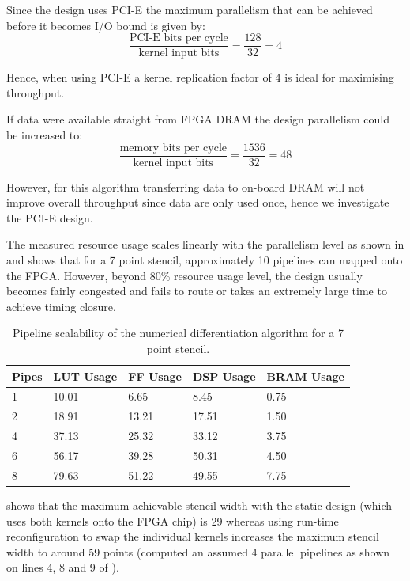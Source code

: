 Since the design uses PCI-E the maximum parallelism that can be
achieved before it becomes I/O bound is given by:
$$\frac{\text{PCI-E bits per cycle}}{\text{kernel input bits}} = \frac{128}{32} = 4$$

Hence, when using PCI-E a kernel replication factor of 4 is ideal for
maximising throughput.

If data were available straight from FPGA DRAM the design parallelism
could be increased to:
$$\frac{\text{memory bits per cycle}}{\text{kernel input bits}} = \frac{1536}{32} = 48$$

However, for this algorithm transferring data to on-board DRAM will
not improve overall throughput since data are only used once, hence we
investigate the PCI-E design.

The measured resource usage scales linearly with the parallelism level
as shown in  and shows that for a 7 point stencil,
approximately 10 pipelines can mapped onto the FPGA. However, beyond
80\% resource usage level, the design usually becomes fairly congested
and fails to route or takes an extremely large time to achieve timing
closure.

\begin{table}[ht!]
  \begin{tabularx}{\textwidth}{X|X|X|X|X}
    Pipes & LUT Usage & FF Usage & DSP Usage & BRAM Usage \\
    \hline\hline
    1     & 10.01     & 6.65     & 8.45      & 0.75       \\
    2     & 18.91     & 13.21    & 17.51     & 1.50       \\
    4     & 37.13     & 25.32    & 33.12     & 3.75       \\
    6     & 56.17     & 39.28    & 50.31     & 4.50       \\
    8     & 79.63     & 51.22    & 49.55     & 7.75       \\
  \end{tabularx}
  \caption{Pipeline scalability of the numerical differentiation algorithm for a 7 point stencil.}
  \label{table:nd1}
\end{table}

 shows that the maximum achievable stencil width with
the static design (which uses both kernels onto the FPGA chip) is 29
whereas using run-time reconfiguration to swap the individual kernels
increases the maximum stencil width to around 59 points (computed an
assumed 4 parallel pipelines as shown on lines 4, 8 and 9 of
).

